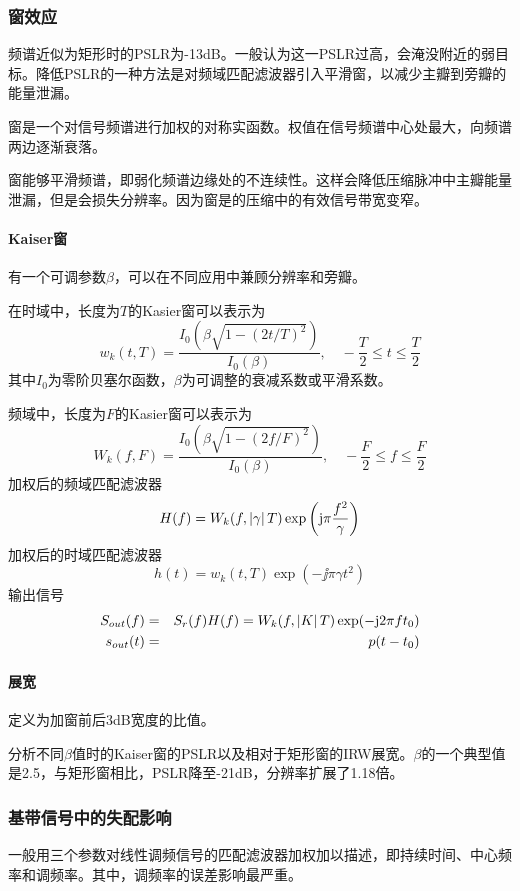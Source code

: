 \subsubsection{窗效应}
频谱近似为矩形时的PSLR为-13dB。一般认为这一PSLR过高，会淹没附近的弱目标。降低PSLR的一种方法是对频域匹配滤波器引入平滑窗，以减少主瓣到旁瓣的能量泄漏。

窗是一个对信号频谱进行加权的对称实函数。权值在信号频谱中心处最大，向频谱两边逐渐衰落。

窗能够平滑频谱，即弱化频谱边缘处的不连续性。这样会降低压缩脉冲中主瓣能量泄漏，但是会损失分辨率。因为窗是的压缩中的有效信号带宽变窄。
\paragraph{Kaiser窗}
有一个可调参数$\beta$，可以在不同应用中兼顾分辨率和旁瓣。

在时域中，长度为$T$的Kasier窗可以表示为
\begin{equation}
w_k(t, T) = \frac{I_0(\beta\sqrt{1-(2t/T)^2})}{I_0(\beta)},\quad -\frac{T}{2}\leq t\leq \frac{T}{2}
\end{equation}
其中$I_0$为零阶贝塞尔函数，$\beta$为可调整的衰减系数或平滑系数。

频域中，长度为$F$的Kasier窗可以表示为
\begin{equation}
W_k(f, F) = \frac{I_0(\beta\sqrt{1 - (2f/F)^2})}{I_0(\beta)}, \quad -\frac{F}{2}\leq f\leq\frac{F}{2}
\end{equation}
加权后的频域匹配滤波器
\begin{eqnarray}
H(f) = W_k(f, \left| \gamma \right|T)\exp\left(\mathrm{j}\pi\frac{f^2}{\gamma}\right)
\end{eqnarray}
加权后的时域匹配滤波器
\begin{equation}
h(t) = w_k(t, T)\exp(-\jj\pi\gamma t^2)
\end{equation}
输出信号
\begin{eqnarray}
S_{out}(f) &=& S_r(f)H(f) = W_k(f, \left| K \right|T)\exp(-\mathrm{j}2\pi ft_0) \\
s_{out}(t) &=& p(t - t_0)
\end{eqnarray}
\paragraph{展宽}
定义为加窗前后3dB宽度的比值。

分析不同$\beta$值时的Kaiser窗的PSLR以及相对于矩形窗的IRW展宽。$\beta$的一个典型值是2.5，与矩形窗相比，PSLR降至-21dB，分辨率扩展了1.18倍。
\subsubsection{基带信号中的失配影响}
一般用三个参数对线性调频信号的匹配滤波器加权加以描述，即持续时间、中心频率和调频率。其中，调频率的误差影响最严重。

